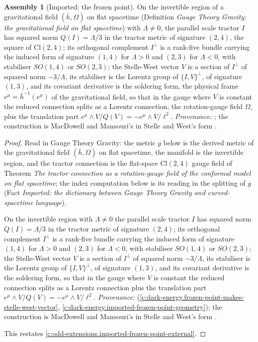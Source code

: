 \documentclass[11pt]{article}
\theoremstyle{definition}
\newtheorem{assembled}[theorem]{Assembly}
\theoremstyle{plain}
\newcommand{\changedmark}[2]{\marginpar{\raggedright\scriptsize\color{#1}#2}}
\providecommand{\Cl}{}\renewcommand{\Cl}{\mathrm{Cl}}
\providecommand{\hb}{}\renewcommand{\hb}{\bar{h}}
\begin{document}
\begin{assembled}[Imported: the frozen point]\label{c:odd-extensions.imported-frozen-point}
\changedmark{BurntOrange}{changed since the deposit}
On the invertible region of a gravitational field $(\hb, \Omega)$ on flat spacetime (Definition \emph{Gauge Theory Gravity: the gravitational field on flat spacetime}) with $\Lambda \neq 0$, the parallel scale tractor $I$ has squared norm $Q(I) = \Lambda/3$ in the tractor metric of signature $(2,4)$, the square of $\Cl(2,4)$; its orthogonal complement $I^{\perp}$ is a rank-five bundle carrying the induced form of signature $(1,4)$ for $\Lambda > 0$ and $(2,3)$ for $\Lambda < 0$, with stabiliser $SO(1,4)$ or $SO(2,3)$; the Stelle-West vector $V$ is a section of $I^{\perp}$ of squared norm $-3/\Lambda$, its stabiliser is the Lorentz group of $\{I, V\}^{\perp}$, of signature $(1,3)$, and its covariant derivative is the soldering form, the physical frame $e^{\mu} = \hb^{-1}(e^{\mu})$ of the gravitational field, so that in the gauge where $V$ is constant the reduced connection splits as a Lorentz connection, the rotation-gauge field $\Omega$, plus the translation part $e^{\mu}\wedge V/Q(V) = -e^{\mu}\wedge V/\ell^{2}$. \emph{Provenance:} \cite[Fact~2.1, Thm.~3.1]{ButlerT10}; the construction is MacDowell and Mansouri's \cite{MacDowellMansouri1977} in Stelle and West's form \cite{StelleWest1980}.
\end{assembled}
\begin{proof}
Read in Gauge Theory Gravity: the metric $g$ below is the derived metric of the gravitational field $(\hb, \Omega)$ on flat spacetime, the manifold is the invertible region, and the tractor connection is the flat-space $\Cl(2,4)$ gauge field of Theorem \emph{The tractor connection as a rotation-gauge field of the conformal model on flat spacetime}; the index computation below is its reading in the splitting of $g$ (Fact \emph{Imported: the dictionary between Gauge Theory Gravity and curved-spacetime language}).

On the invertible region with $\Lambda \neq 0$ the parallel scale tractor $I$ has squared norm $Q(I) = \Lambda/3$ in the tractor metric of signature $(2,4)$; its orthogonal complement $I^{\perp}$ is a rank-five bundle carrying the induced form of signature $(1,4)$ for $\Lambda > 0$ and $(2,3)$ for $\Lambda < 0$, with stabiliser $SO(1,4)$ or $SO(2,3)$; the Stelle-West vector $V$ is a section of $I^{\perp}$ of squared norm $-3/\Lambda$, its stabiliser is the Lorentz group of $\{I, V\}^{\perp}$, of signature $(1,3)$, and its covariant derivative is the soldering form, so that in the gauge where $V$ is constant the reduced connection splits as a Lorentz connection plus the translation part $e^{\mu}\wedge V/Q(V) = -e^{\mu}\wedge V/\ell^{2}$. \emph{Provenance:} \cite[Fact~2.1, Thm.~3.1]{ButlerT10} (\ref{c:dark-energy.frozen-point-makes-stelle-west-vector}, \ref{c:dark-energy.imported-frozen-point-geometry}); the construction is MacDowell and Mansouri's \cite{MacDowellMansouri1977} in Stelle and West's form \cite{StelleWest1980}.

This restates \ref{c:odd-extensions.imported-frozen-point-external}.

\end{proof}
\end{document}
